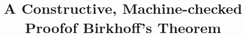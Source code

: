 \documentclass[sigplan,screen]{acmart}
\begin{document}
\title{A Constructive, Machine-checked Proof\break of Birkhoff's Theorem}

\author{}
\end{document}
